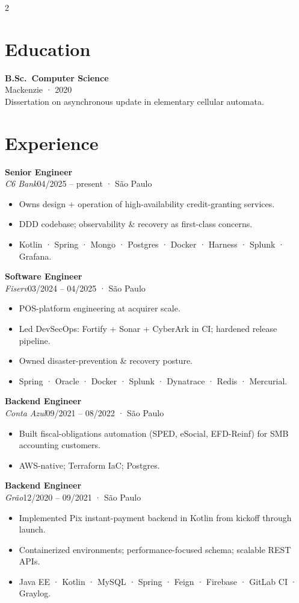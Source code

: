 \documentclass[10pt,a4paper]{article}
\newcommand{\role}[4]{\textbf{#1}\\\textit{\color{muted}#2}\hfill\small\color{muted}#3 · #4\par\smallskip}
\begin{document}
\begin{paracol}{2}
\section{Education}
\footnotesize \textbf{B.Sc.\ Computer Science}\\Mackenzie · 2020\\\color{muted}\scriptsize Dissertation on asynchronous update in elementary cellular automata.

\switchcolumn

\section{Experience}
\footnotesize

\role{Senior Engineer}{C6 Bank}{04/2025 -- present}{São Paulo}
\begin{itemize}
\item Owns design + operation of high-availability credit-granting services.
\item DDD codebase; observability \& recovery as first-class concerns.
\item Kotlin · Spring · Mongo · Postgres · Docker · Harness · Splunk · Grafana.
\end{itemize}\smallskip

\role{Software Engineer}{Fiserv}{03/2024 -- 04/2025}{São Paulo}
\begin{itemize}
\item POS-platform engineering at acquirer scale.
\item Led DevSecOps: Fortify + Sonar + CyberArk in CI; hardened release pipeline.
\item Owned disaster-prevention \& recovery posture.
\item Spring · Oracle · Docker · Splunk · Dynatrace · Redis · Mercurial.
\end{itemize}\smallskip

\role{Backend Engineer}{Conta Azul}{09/2021 -- 08/2022}{São Paulo}
\begin{itemize}
\item Built fiscal-obligations automation (SPED, eSocial, EFD-Reinf) for SMB accounting customers.
\item AWS-native; Terraform IaC; Postgres.
\end{itemize}\smallskip

\role{Backend Engineer}{Grão}{12/2020 -- 09/2021}{São Paulo}
\begin{itemize}
\item Implemented Pix instant-payment backend in Kotlin from kickoff through launch.
\item Containerized environments; performance-focused schema; scalable REST APIs.
\item Java EE · Kotlin · MySQL · Spring · Feign · Firebase · GitLab CI · Graylog.
\end{itemize}\smallskip


\end{paracol}
\end{document}
